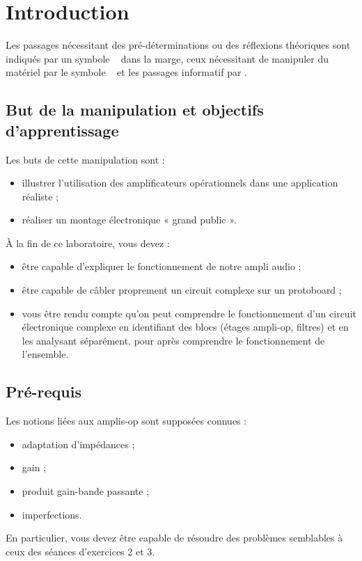 \documentclass{../template/labo}
\author{The Fantastic Four}
\begin{document}


\section{Introduction}

Les passages nécessitant des pré-déterminations ou des réflexions théoriques sont indiqués par un symbole \faCogs~ dans la marge,
ceux nécessitant de manipuler du matériel par le symbole \faFlask~ et les passages informatif par \faLightbulbO.

\subsection{But de la manipulation et objectifs d'apprentissage}

Les buts de cette manipulation sont :
\begin{itemize}
	\item illustrer l'utilisation des amplificateurs opérationnels dans une application réaliste ;
	\item réaliser un montage électronique « grand public ».
\end{itemize}

À la fin de ce laboratoire, vous devez  :
\vspace{3mm}
\begin{itemize}
\item être capable d'expliquer le fonctionnement de notre ampli audio ;
\item être capable de câbler proprement un circuit complexe sur un protoboard ;
\item vous être rendu compte qu'on peut comprendre le fonctionnement d'un circuit électronique complexe en identifiant des blocs (étages ampli-op, filtres) et en les analysant séparément, pour après comprendre le fonctionnement de l'ensemble.
\end{itemize}

\subsection{Pré-requis}
Les notions liées aux amplis-op sont supposées connues :
\begin{itemize}
\item adaptation d'impédances ;
\item gain ;
\item produit gain-bande passante ;
\item imperfections.
\end{itemize}
En particulier, vous devez être capable de résoudre des problèmes semblables à ceux des séances d'exercices 2 et 3.
\end{document}
